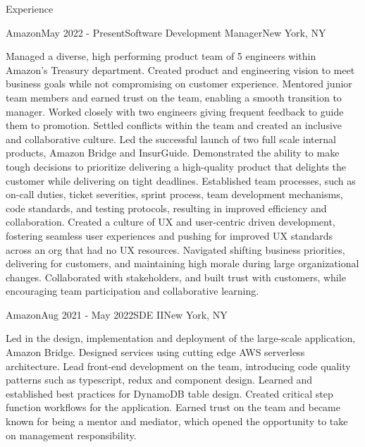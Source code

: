 \documentclass{resume} %
\begin{document}

\begin{rSection}{Experience}


\begin{rSubsection}{Amazon}{May 2022 - Present}{Software Development Manager}{New York, NY}

Managed a diverse, high performing product team of 5 engineers within Amazon's Treasury department. 
Created product and engineering vision to meet business goals while not compromising on customer 
experience. Mentored junior team members and earned trust on the team, enabling a smooth 
transition to manager. Worked closely with two engineers giving frequent feedback to guide them 
to promotion. Settled conflicts within the team and created an inclusive and collaborative 
culture. Led the successful launch of two full scale internal products, Amazon Bridge and 
InsurGuide. Demonstrated the ability to make tough decisions to prioritize delivering a 
high-quality product that delights the customer while delivering on tight deadlines. Established 
team processes, such as on-call duties, ticket severities, sprint process, team development 
mechanisms, code standards, and testing protocols, resulting in improved efficiency and 
collaboration. Created a culture of UX and user-centric driven development, fostering seamless 
user experiences and pushing for improved UX standards across an org that had no UX resources. 
Navigated shifting business priorities, delivering for customers, and maintaining high morale 
during large organizational changes. Collaborated with stakeholders, and built trust with 
customers, while encouraging team participation and collaborative learning.

\end{rSubsection}
\begin{rSubsection}{Amazon}{Aug 2021 - May 2022}{SDE II}{New York, NY}

Led in the design, implementation and deployment of the large-scale application, Amazon Bridge. 
Designed services using cutting edge AWS serverless architecture. Lead front-end development on 
the team, introducing code quality patterns such as typescript, redux and component design. 
Learned and established best practices for DynamoDB table design. Created critical step 
function workflows for the application. Earned trust on the team and became known for being a 
mentor and mediator, which opened the opportunity to take on management responsibility.


\end{rSubsection}
\end{rSection}
\end{document}
